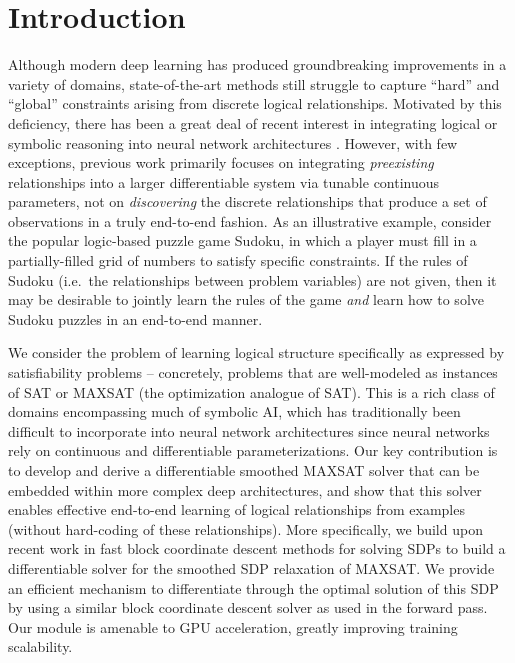 \documentclass{article}
\begin{document}
	\section{Introduction}
	
	Although modern deep learning has produced groundbreaking improvements in a variety of domains, state-of-the-art methods still struggle to capture ``hard'' and ``global'' constraints arising from discrete logical relationships.  Motivated by this deficiency, there has been a great deal of recent interest in integrating logical or symbolic reasoning into neural network architectures \cite{palm2017recurrent, yang2017differentiable, cingillioglu2018deeplogic, evans2018learning}.  However, with few exceptions, previous work primarily focuses on integrating \emph{preexisting} relationships into a larger differentiable system via tunable continuous parameters, not on \emph{discovering} the discrete relationships that produce a set of observations in a truly end-to-end fashion.
    As an illustrative example, consider the popular logic-based puzzle game Sudoku, in which a player must fill in a  partially-filled grid of numbers to satisfy specific constraints. 
    If the rules of Sudoku (i.e.~the relationships between problem variables) are not given, then it may be desirable to jointly learn the rules of the game \emph{and} learn how to solve Sudoku puzzles in an end-to-end manner.

	We consider the problem of learning logical structure specifically as expressed by satisfiability problems -- concretely, problems that are well-modeled as instances of SAT or MAXSAT (the optimization analogue of SAT).  
	This is a rich class of domains encompassing much of symbolic AI, which has traditionally been difficult to incorporate into neural network architectures since neural networks rely on continuous and differentiable parameterizations.  
	Our key contribution is to develop and derive a differentiable smoothed MAXSAT solver that can be embedded within more complex deep architectures, and show that this solver enables effective end-to-end learning of
logical relationships from examples (without hard-coding of these relationships).
More specifically, we build upon recent work in fast block coordinate descent methods for solving SDPs \cite{wang2017mixing} to build a differentiable solver for the smoothed SDP relaxation of MAXSAT.
	We provide an efficient mechanism to differentiate through the optimal solution of this SDP by using a similar block coordinate descent solver as used in the forward pass.  
	Our module is amenable to GPU acceleration, greatly improving training scalability.  
\end{document}
